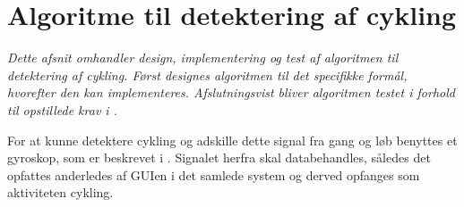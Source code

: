 \section{Algoritme til detektering af cykling}\label{sec:algocykel}
\textit{Dette afsnit omhandler design, implementering og test af algoritmen til detektering af cykling. Først designes algoritmen til det specifikke formål, hvorefter den kan implementeres. Afslutningsvist bliver algoritmen testet i forhold til opstillede krav i .} 

For at kunne detektere cykling og adskille dette signal fra gang og løb benyttes et gyroskop, som er beskrevet i . Signalet herfra skal databehandles, således det opfattes anderledes af GUIen i det samlede system og derved opfanges som aktiviteten cykling. 

